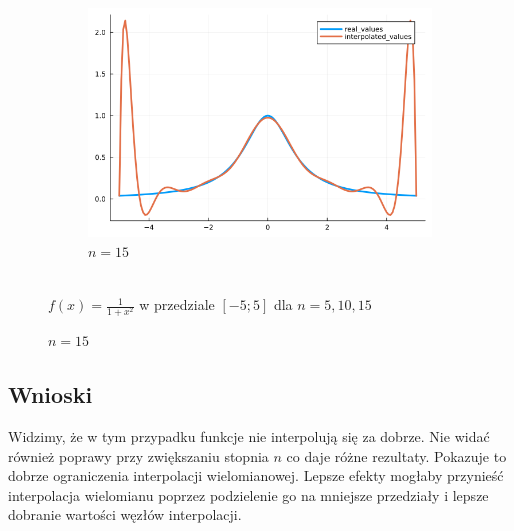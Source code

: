 \documentclass{article}
\def\v{0.47}
\begin{document}
\begin{figure}[H]
\begin{subfigure}[b]{\v\linewidth}
			\includegraphics[width=\linewidth]{graphs/zad6.b.15.png}
			\caption{$n = 15$}
		\end{subfigure}
	\\{$f(x) = \frac{1}{1+x^2}$ w przedziale $[-5;5]$ dla $n = 5,10,15$}
	\end{figure}

\clearpage
\subsection*{Wnioski}
	Widzimy, że w tym przypadku funkcje nie interpolują się za dobrze. Nie widać również poprawy przy zwiększaniu stopnia $n$ co daje różne rezultaty. Pokazuje to dobrze ograniczenia interpolacji wielomianowej. Lepsze efekty mogłaby przynieść interpolacja wielomianu poprzez podzielenie go na mniejsze przedziały i lepsze dobranie wartości węzłów interpolacji.
\end{document}
